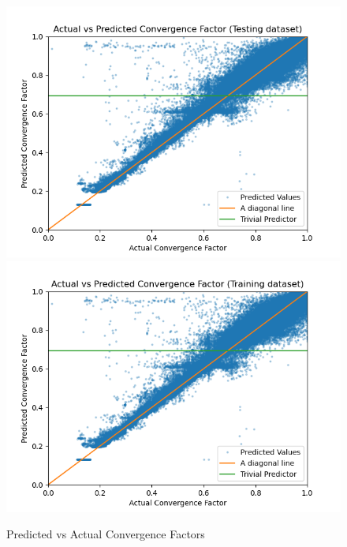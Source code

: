 \begin{figure}[h]
  \centering
  \includegraphics[scale=0.7]{figures/jacobi-conv/conv_test_pred.png}
  \includegraphics[scale=0.7]{figures/jacobi-conv/conv_train_pred.png}
  \caption{Predicted vs Actual Convergence Factors}
  \label{fig:conv_preds}
\end{figure}

